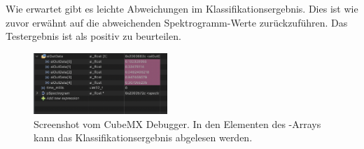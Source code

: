 \begin{adjustwidth}{0.5cm}{0cm}
Wie erwartet gibt es leichte Abweichungen im Klassifikationsergebnis. Dies ist wie zuvor erwähnt auf die abweichenden Spektrogramm-Werte zurückzuführen. Das Testergebnis ist als positiv zu beurteilen. 

\begin{figure}[h!]
\centering
\includegraphics[width=0.45\textwidth]{images/10_test_validierung/nn/nn-debuger-classification-result.png}
\caption{Screenshot vom CubeMX Debugger. In den Elementen des -Arrays kann das Klassifikationsergebnis abgelesen werden.}
\label{fig:img-stm-classification-result}
\end{figure}

\end{adjustwidth}

